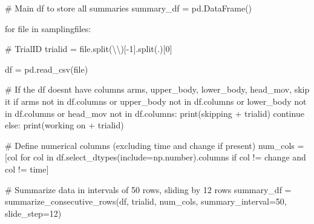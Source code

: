 \documentclass[
  letterpaper,
  DIV=11,
  numbers=noendperiod]{scrreprt}
\newenvironment{Shaded}{\begin{snugshade}}{\end{snugshade}}
\newcommand{\BuiltInTok}[1]{\textcolor[rgb]{0.00,0.23,0.31}{#1}}
\newcommand{\CharTok}[1]{\textcolor[rgb]{0.13,0.47,0.30}{#1}}
\newcommand{\CommentTok}[1]{\textcolor[rgb]{0.37,0.37,0.37}{#1}}
\newcommand{\ControlFlowTok}[1]{\textcolor[rgb]{0.00,0.23,0.31}{#1}}
\newcommand{\DecValTok}[1]{\textcolor[rgb]{0.68,0.00,0.00}{#1}}
\newcommand{\KeywordTok}[1]{\textcolor[rgb]{0.00,0.23,0.31}{#1}}
\newcommand{\NormalTok}[1]{\textcolor[rgb]{0.00,0.23,0.31}{#1}}
\newcommand{\OperatorTok}[1]{\textcolor[rgb]{0.37,0.37,0.37}{#1}}
\newcommand{\StringTok}[1]{\textcolor[rgb]{0.13,0.47,0.30}{#1}}
\begin{document}
\begin{Shaded}
\begin{Highlighting}[]
\CommentTok{\# Main df to store all summaries}
\NormalTok{summary\_df }\OperatorTok{=}\NormalTok{ pd.DataFrame()}

\ControlFlowTok{for} \BuiltInTok{file} \KeywordTok{in}\NormalTok{ samplingfiles:}

    \CommentTok{\# TrialID}
\NormalTok{    trialid }\OperatorTok{=} \BuiltInTok{file}\NormalTok{.split(}\StringTok{\textquotesingle{}}\CharTok{\textbackslash{}\textbackslash{}}\StringTok{\textquotesingle{}}\NormalTok{)[}\OperatorTok{{-}}\DecValTok{1}\NormalTok{].split(}\StringTok{\textquotesingle{}.\textquotesingle{}}\NormalTok{)[}\DecValTok{0}\NormalTok{]}

\NormalTok{    df }\OperatorTok{=}\NormalTok{ pd.read\_csv(}\BuiltInTok{file}\NormalTok{)}

    \CommentTok{\# If the df doesn\textquotesingle{}t have columns arms, upper\_body, lower\_body, head\_mov, skip it}
    \ControlFlowTok{if} \StringTok{\textquotesingle{}arms\textquotesingle{}} \KeywordTok{not} \KeywordTok{in}\NormalTok{ df.columns }\KeywordTok{or} \StringTok{\textquotesingle{}upper\_body\textquotesingle{}} \KeywordTok{not} \KeywordTok{in}\NormalTok{ df.columns }\KeywordTok{or} \StringTok{\textquotesingle{}lower\_body\textquotesingle{}} \KeywordTok{not} \KeywordTok{in}\NormalTok{ df.columns }\KeywordTok{or} \StringTok{\textquotesingle{}head\_mov\textquotesingle{}} \KeywordTok{not} \KeywordTok{in}\NormalTok{ df.columns:}
        \BuiltInTok{print}\NormalTok{(}\StringTok{\textquotesingle{}skipping \textquotesingle{}} \OperatorTok{+}\NormalTok{ trialid)}
        \ControlFlowTok{continue}
    \ControlFlowTok{else}\NormalTok{:}
        \BuiltInTok{print}\NormalTok{(}\StringTok{\textquotesingle{}working on \textquotesingle{}} \OperatorTok{+}\NormalTok{ trialid)}

    \CommentTok{\# Define numerical columns (excluding \textquotesingle{}time\textquotesingle{} and \textquotesingle{}change\textquotesingle{} if present)}
\NormalTok{    num\_cols }\OperatorTok{=}\NormalTok{ [col }\ControlFlowTok{for}\NormalTok{ col }\KeywordTok{in}\NormalTok{ df.select\_dtypes(include}\OperatorTok{=}\NormalTok{np.number).columns }\ControlFlowTok{if}\NormalTok{ col }\OperatorTok{!=} \StringTok{\textquotesingle{}change\textquotesingle{}} \KeywordTok{and}\NormalTok{ col }\OperatorTok{!=} \StringTok{\textquotesingle{}time\textquotesingle{}}\NormalTok{]}

    \CommentTok{\# Summarize data in intervals of 50 rows, sliding by 12 rows}
\NormalTok{    summary\_df }\OperatorTok{=}\NormalTok{ summarize\_consecutive\_rows(df, trialid, num\_cols, summary\_interval}\OperatorTok{=}\DecValTok{50}\NormalTok{, slide\_step}\OperatorTok{=}\DecValTok{12}\NormalTok{)}


\end{Highlighting}
\end{Shaded}
\end{document}
